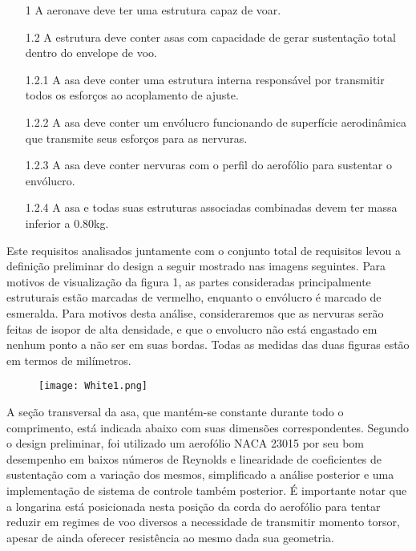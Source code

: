 \documentclass[a4paper]{article}
\begin{document}
\begin{itemize}
    \item[1] A aeronave deve ter uma estrutura capaz de voar.
    \item[1.2] A estrutura deve conter asas com capacidade de gerar sustentação total dentro do envelope de voo.
    \item[1.2.1] A asa deve conter uma estrutura interna responsável por transmitir todos os esforços ao acoplamento de ajuste.
    \item[1.2.2] A asa deve conter um envólucro funcionando de superfície aerodinâmica que transmite seus esforços para as nervuras.
    \item[1.2.3] A asa deve conter nervuras com o perfil do aerofólio para sustentar o envólucro.
    \item[1.2.4] A asa e todas suas estruturas associadas combinadas devem ter massa inferior a 0.80kg.
\end{itemize}

\newpage

Este requisitos analisados juntamente com o conjunto total de requisitos levou a definição preliminar do design a seguir mostrado nas imagens seguintes. Para motivos de visualização da figura 1, as partes consideradas principalmente estruturais estão marcadas de vermelho, enquanto o envólucro é marcado de esmeralda. Para motivos desta análise, consideraremos que as nervuras serão feitas de isopor de alta densidade, e que o envolucro não está engastado em nenhum ponto a não ser em suas bordas. Todas as medidas das duas figuras estão em termos de milímetros.

\begin{figure}[H]
    \centering
    \texttt{[image: White1.png]}
    \caption{\label{fig:1}}
\end{figure}

A seção transversal da asa, que mantém-se constante durante todo o comprimento, está indicada abaixo com suas dimensões correspondentes. Segundo o design preliminar, foi utilizado um aerofólio NACA 23015 por seu bom desempenho em baixos números de Reynolds e linearidade de coeficientes de sustentação com a variação dos mesmos, simplificado a análise posterior e uma implementação de sistema de controle também posterior. É importante notar que a longarina está posicionada nesta posição da corda do aerofólio para tentar reduzir em regimes de voo diversos a necessidade de transmitir momento torsor, apesar de ainda oferecer resistência ao mesmo dada sua geometria.
\end{document}
